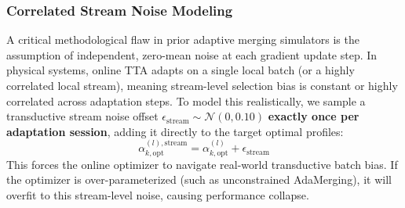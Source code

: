 \subsubsection{Correlated Stream Noise Modeling}
A critical methodological flaw in prior adaptive merging simulators is the assumption of independent, zero-mean noise at each gradient update step.
In physical systems, online TTA adapts on a single local batch (or a highly correlated local stream), meaning stream-level selection bias is constant or highly correlated across adaptation steps.
To model this realistically, we sample a transductive stream noise offset $\epsilon_{\text{stream}} \sim \mathcal{N}(0, 0.10)$ \textbf{exactly once per adaptation session}, adding it directly to the target optimal profiles:
\begin{equation}
\label{eq:stream_noise}
\alpha_{k, \text{opt}}^{(l),\text{stream}} = \alpha_{k, \text{opt}}^{(l)} + \epsilon_{\text{stream}}
\end{equation}
This forces the online optimizer to navigate real-world transductive batch bias.
If the optimizer is over-parameterized (such as unconstrained AdaMerging), it will overfit to this stream-level noise, causing performance collapse.

